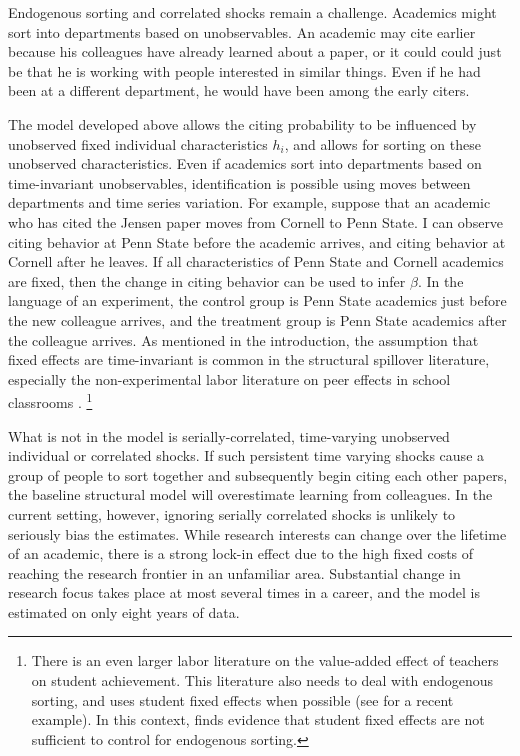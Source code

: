 Endogenous sorting and correlated shocks remain a challenge.  Academics might sort into 
departments based on unobservables. An academic may cite
earlier because his colleagues have already learned about a paper, or it
could could just be that he is working with people interested in
similar things. Even if he had been at a different department, he would
have been among the early citers.

The model developed above allows the citing probability to be influenced
by unobserved fixed individual characteristics $h_i$, and allows for
sorting on these unobserved characteristics. Even if academics sort into
departments based on time-invariant unobservables, identification is
possible using moves between departments and time series variation. For
example, suppose that an academic who has cited the Jensen paper moves from
Cornell to Penn State. I can observe citing behavior at Penn State
before the academic arrives, and
citing behavior at Cornell after he leaves. If all characteristics of
Penn State and Cornell academics are fixed, then the change in citing
behavior can be used to infer $\beta$. In the language of an experiment,
the control group is Penn State academics just before the new colleague
arrives, and the treatment group is Penn State academics after the
colleague arrives.  As mentioned in the introduction, the assumption that 
 fixed effects are time-invariant is common in the structural spillover literature,
 especially the non-experimental labor literature on peer
 effects in school classrooms \citep{bettsa2004peer, arcidiacono2012estimating, burke2013classroom}.
\footnote{
There is an even larger labor literature on the value-added
effect of teachers on student achievement.  This literature also needs
to deal with endogenous sorting, and uses student fixed effects when
possible (see \citet{harris2011teacher} for a recent example).
In this context, \citet{rothstein2010teacher}
finds evidence that student fixed effects are not sufficient to control
for endogenous sorting.}

What is not in the model is serially-correlated, time-varying unobserved
individual or correlated shocks. If such persistent time varying shocks cause a group of people to
sort together and subsequently begin citing each other papers, the
baseline structural model will overestimate learning from colleagues.
In the current setting, however, ignoring serially correlated shocks is 
unlikely to seriously bias the estimates.  While research interests can
change over the lifetime of an academic, there is a strong lock-in effect
due to the high fixed costs of reaching the research frontier in an unfamiliar
area.  Substantial change in research focus takes place at most
several times in a career, and the model is estimated on only eight
years of data.


